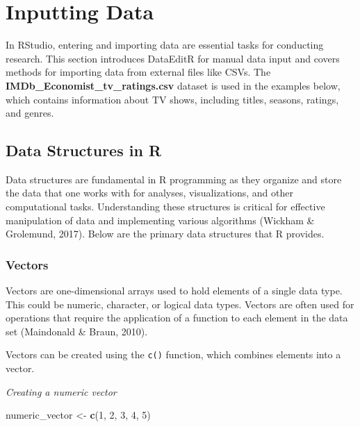 \documentclass[
]{book}
\newenvironment{Shaded}{\begin{snugshade}}{\end{snugshade}}
\newcommand{\DecValTok}[1]{\textcolor[rgb]{0.00,0.00,0.81}{#1}}
\newcommand{\FunctionTok}[1]{\textcolor[rgb]{0.13,0.29,0.53}{\textbf{#1}}}
\newcommand{\NormalTok}[1]{#1}
\newcommand{\OtherTok}[1]{\textcolor[rgb]{0.56,0.35,0.01}{#1}}
\begin{document}
\section{Inputting Data}\label{inputting-data}

In RStudio, entering and importing data are essential tasks for conducting research. This section introduces DataEditR for manual data input and covers methods for importing data from external files like CSVs. The \textbf{IMDb\_Economist\_tv\_ratings.csv} dataset is used in the examples below, which contains information about TV shows, including titles, seasons, ratings, and genres.

\subsection*{Data Structures in R}\label{data-structures-in-r}

Data structures are fundamental in R programming as they organize and store the data that one works with for analyses, visualizations, and other computational tasks. Understanding these structures is critical for effective manipulation of data and implementing various algorithms (Wickham \& Grolemund, 2017). Below are the primary data structures that R provides.

\subsubsection*{Vectors}\label{vectors}

Vectors are one-dimensional arrays used to hold elements of a single data type. This could be numeric, character, or logical data types. Vectors are often used for operations that require the application of a function to each element in the data set (Maindonald \& Braun, 2010).

Vectors can be created using the \texttt{c()} function, which combines elements into a vector.

\emph{Creating a numeric vector}

\begin{Shaded}
\begin{Highlighting}[]
\NormalTok{numeric\_vector }\OtherTok{\textless{}{-}} \FunctionTok{c}\NormalTok{(}\DecValTok{1}\NormalTok{, }\DecValTok{2}\NormalTok{, }\DecValTok{3}\NormalTok{, }\DecValTok{4}\NormalTok{, }\DecValTok{5}\NormalTok{)}
\end{Highlighting}
\end{Shaded}
\end{document}
